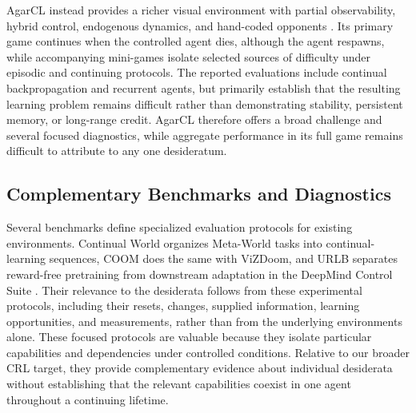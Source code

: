 \documentclass[10pt,journal,compsoc]{IEEEtran}
\begin{document}
AgarCL instead provides a richer visual environment with partial observability, hybrid control, endogenous dynamics, and hand-coded opponents \cite{mohamed2026}.
Its primary game continues when the controlled agent dies, although the agent respawns, while accompanying mini-games isolate selected sources of difficulty under episodic and continuing protocols.
The reported evaluations include continual backpropagation and recurrent agents, but primarily establish that the resulting learning problem remains difficult rather than demonstrating stability, persistent memory, or long-range credit.
AgarCL therefore offers a broad challenge and several focused diagnostics, while aggregate performance in its full game remains difficult to attribute to any one desideratum.

\subsection{Complementary Benchmarks and Diagnostics}
\label{sec:landscape-complementary}

Several benchmarks define specialized evaluation protocols for existing environments.
Continual World organizes Meta-World tasks into continual-learning sequences, COOM does the same with ViZDoom, and URLB separates reward-free pretraining from downstream adaptation in the DeepMind Control Suite \cite{wolczyk2021,tomilin2023,laskin2021}.
Their relevance to the desiderata follows from these experimental protocols, including their resets, changes, supplied information, learning opportunities, and measurements, rather than from the underlying environments alone.
These focused protocols are valuable because they isolate particular capabilities and dependencies under controlled conditions.
Relative to our broader CRL target, they provide complementary evidence about individual desiderata without establishing that the relevant capabilities coexist in one agent throughout a continuing lifetime.
\end{document}
